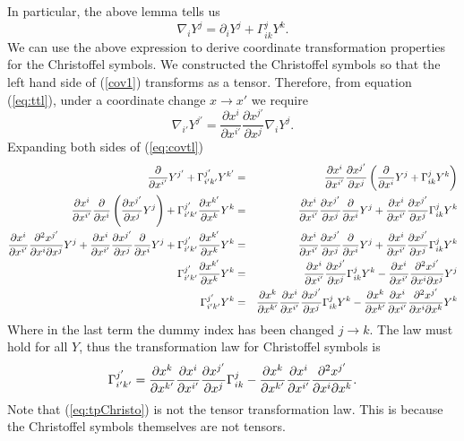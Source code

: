 In particular, the above lemma tells us 
\begin{equation} 
\nabla_i Y^j = \partial_i Y^j + \Gamma^j_{ik} Y^k. \label{cov1} 
\end{equation}
We can use the above expression to derive coordinate transformation properties for the Christoffel symbols. We constructed the Christoffel symbols so that the left hand side of (\ref{cov1}) transforms as a tensor. Therefore, from equation (\ref{eq:ttl}), under a coordinate change $x\rightarrow x'$ we require
\begin{equation}
\nabla_{i'}Y^{j'}=\frac{\partial x^i}{\partial x^{i'}}\frac{\partial x^{j'}}{\partial x^j}\nabla_i Y^j.
\label{eq:covtl} 
\end{equation}
Expanding both sides of (\ref{eq:covtl})
\begin{eqnarray*}
\frac{\partial}{\partial x^{i'}}Y^{j'}+\Gamma^{j'}_{i'k'}Y^{k'}&=& \displaystyle{\frac{\partial x^i}{\partial x^{i'}}\frac{\partial x^{j'}}{\partial x^j}\left(\frac{\partial}{\partial x^{i}}Y^{j}+\Gamma^{j}_{ik}Y^{k}\right)}\\
\frac{{\partial} x^i}{{\partial} x^{i'}}\frac{{\partial}}{{\partial} x^i}\left(\frac{{\partial} x^{j'}}{{\partial} x^j}Y^j\right)+\Gamma^{j'}_{i'k'}\frac{{\partial} x^{k'}}{{\partial} x^k} Y^k &=& \frac{{\partial} x^i}{{\partial} x^{i'}}\frac{{\partial} x^{j'}}{{\partial} x^j}\frac{{\partial}}{{\partial} x^{i}}Y^j +\frac{{\partial} x^i}{{\partial} x^{i'}}\frac{{\partial} x^{j'}}{{\partial} x^j}\Gamma^j_{ik}Y^k \\
\frac{{\partial} x^i}{{\partial} x^{i'}}\frac{{\partial}^2x^{j'}}{{\partial} x^i{\partial} x^j}Y^j+\frac{{\partial} x^i}{{\partial} x^{i'}}\frac{{\partial} x^{j'}}{{\partial} x^j}\frac{{\partial}}{{\partial} x^i}Y^j+\Gamma^{j'}_{i'k'}\frac{{\partial} x^{k'}}{{\partial} x^k} Y^k &=& \frac{{\partial} x^i}{{\partial} x^{i'}}\frac{{\partial} x^{j'}}{{\partial} x^j}\frac{{\partial}}{{\partial} x^{i}}Y^j +\frac{{\partial} x^i}{{\partial} x^{i'}}\frac{{\partial} x^{j'}}{{\partial} x^j}\Gamma^j_{ik}Y^k \\
\Gamma^{j'}_{i'k'}\frac{{\partial} x^{k'}}{{\partial} x^k} Y^k &=& \frac{{\partial} x^i}{{\partial} x^{i'}}\frac{{\partial} x^{j'}}{{\partial} x^j}\Gamma^j_{ik}Y^k-\frac{{\partial} x^i}{{\partial} x^{i'}}\frac{{\partial}^2x^{j'}}{{\partial} x^i{\partial} x^j}Y^j \\
\Gamma^{j'}_{i'k'} Y^k &=& \frac{{\partial} x^{k}}{{\partial} x^{k'}}\frac{{\partial} x^i}{{\partial} x^{i'}}\frac{{\partial} x^{j'}}{{\partial} x^j}\Gamma^j_{ik}Y^k-\frac{{\partial} x^{k}}{{\partial} x^{k'}}\frac{{\partial} x^i}{{\partial} x^{i'}}\frac{{\partial}^2x^{j'}}{{\partial} x^i{\partial} x^k}Y^k
\end{eqnarray*}
Where in the last term the dummy index has been changed $j\rightarrow k$. The law must hold for all $Y$, thus the transformation law for Christoffel symbols is 
\begin{equation} \Gamma^{j'}_{i'k'} = \frac{{\partial} x^{k}}{{\partial} x^{k'}}\frac{{\partial} x^i}{{\partial} x^{i'}}\frac{{\partial} x^{j'}}{{\partial} x^j}\Gamma^j_{ik}-\frac{{\partial} x^{k}}{{\partial} x^{k'}}\frac{{\partial} x^i}{{\partial} x^{i'}}\frac{{\partial}^2x^{j'}}{{\partial} x^i{\partial} x^k}.\label{eq:tpChristo}\end{equation}
Note that (\ref{eq:tpChristo}) is not the tensor transformation law. This is because the Christoffel symbols themselves are not tensors. \\

